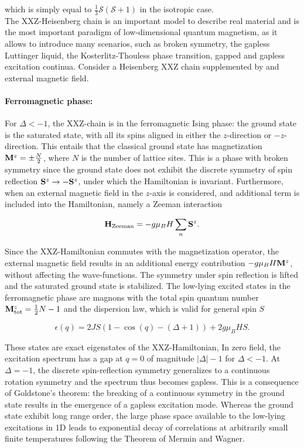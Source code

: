 \documentclass{homework}
\begin{document}
which is simply equal to $\frac{1}{3} \bm{\mathcal S}( \bm{\mathcal S}+ 1)$ in the isotropic case. \\

The XXZ-Heisenberg chain is an important model to describe real material and is the most important paradigm of low-dimensional quantum magnetism, as it allows to introduce many scenarios, such as broken symmetry, the gapless Luttinger liquid, the Kosterlitz-Thouless phase transition, gapped and gapless excitation continua. Consider a Heisenberg XXZ chain supplemented by and external magnetic field. \\

\paragraph{\textbf{Ferromagnetic phase: }}

For $\Delta < -1$, the XXZ-chain is in the ferromagnetic Ising phase: the ground state is the saturated state, with all its spins aligned in either the $z$-direction or $-z$-direction. This entails that the classical ground state has magnetization ${\bf M}^z = \pm \frac{N}{2}$, where $N$ is the number of lattice sites. This is a phase with broken symmetry since the ground state does not exhibit the discrete symmetry of spin reflection ${\bf S}^z \rightarrow -{\bf S}^z$, under which the Hamiltonian is invariant. Furthermore, when an external magnetic field in the $z$-axis is considered, and additional term is included into the Hamiltonian, namely a Zeeman interaction 

$$
    {\bf H}_{\textnormal{Zeeman}} = - g \mu_B H \sum_{n} {\bf S}^z.
$$

Since the XXZ-Hamiltonian commutes with the magnetization operator, the external magnetic field results in an additional energy contribution $-g \mu_B H {\bf M}^z$, without affecting the wave-functions. The symmetry under spin reflection is lifted and the saturated ground state is stabilized. The low-lying excited states in the ferromagnetic phase are magnons with the total spin quantum number ${\bf M}^z_{\textnormal{tot}} = \frac{1}{2} N - 1$ and the dispersion law, which is valid for general spin $S$

\begin{equation}
    \epsilon(q) = 2 J S (1-\cos(q) - (\Delta + 1)) + 2g \mu_B H S. 
    \label{XXZ-spectrum}
\end{equation}

These states are exact eigenstates of the XXZ-Hamiltonian, In zero field, the excitation spectrum has a gap at $q=0$ of magnitude $|\Delta| - 1$ for $\Delta < -1$. At $\Delta = -1$, the discrete spin-reflection symmetry generalizes to a continuous rotation symmetry and the spectrum thus becomes gapless. This is a consequence of Goldstone's theorem: the breaking of a continuous symmetry in the ground state results in the emergence of a gapless excitation mode. Whereas the ground state exhibit long range order, the large phase space available to the low-lying excitations in 1D leads to exponential decay of correlations at arbitrarily small finite temperatures following the Theorem of Mermin and Wagner. \\
\end{document}
